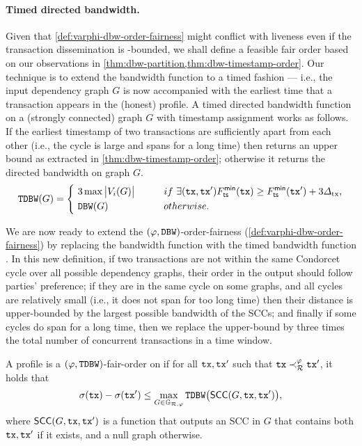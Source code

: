 \paragraph{Timed directed bandwidth.}
%
Given that \cref{def:varphi-dbw-order-fairness} might conflict with liveness even if the transaction dissemination is \txDelay-bounded, we shall define a feasible fair order based on our observations in \cref{thm:dbw-partition,thm:dbw-timestamp-order}.
%
Our technique is to extend the bandwidth function \DBW to a timed fashion --- i.e., the input dependency graph $G$ is now accompanied with the earliest time that a transaction appears in the (honest) profile.
%
A timed directed bandwidth function \TDBW on a (strongly connected) graph $G$ with timestamp assignment \mapTimestampMin works as follows.
%
If the earliest timestamp of two transactions are sufficiently apart from each other (i.e., the cycle is large and spans for a long time) then \TDBW returns an upper bound as extracted in \cref{thm:dbw-timestamp-order}; otherwise it returns the directed bandwidth on graph $G$.
%
\begin{eqnarray*}
    \mathtt{TDBW}(G) =
    \left\{~
    \begin{aligned}
         & 3 \max \big| V_i (G) \big| \hspace*{3em} if~\exists (\mathtt{tx}, \mathtt{tx}') F^{\mathsf{min}}_{\mathsf{ts}}(\mathtt{tx}) \ge F^{\mathsf{min}}_{\mathsf{ts}}(\mathtt{tx}') + 3\varDelta_{\mathrm{tx}}, \\
         & \mathtt{DBW}(G) \hspace*{5.7em} otherwise.
    \end{aligned}
    \right.
\end{eqnarray*}

We are now ready to extend the $(\varphi, \mathtt{DBW})$-order-fairness (\cref{def:varphi-dbw-order-fairness}) by replacing the bandwidth function \DBW with the timed bandwidth function \TDBW.
%
In this new definition, if two transactions are not within the same Condorcet cycle over all possible dependency graphs, their order in the output should follow parties' preference;
%
if they are in the same cycle on some graphs, and all cycles are relatively small (i.e., it does not span for too long time) then their distance is upper-bounded by the largest possible bandwidth of the SCCs;
%
and finally if some cycles do span for a long time, then we replace the upper-bound by three times the total number of concurrent transactions in a \txDelay time window.

\begin{definition}
    \label{def:varphi-tdbw-order-fairness}

    A profile \orderOutput is a $(\varphi, \mathtt{TDBW})$-fair-order on \profileSet if for all $\mathtt{tx}, \mathtt{tx}'$ such that $\mathtt{tx} \prec^\varphi_\mathcal{R} \mathtt{tx}'$, it holds that
    \[ \sigma(\mathtt{tx}) - \sigma(\mathtt{tx}') \le \max_{G \in \mathbb{G}_{\mathcal{R}, \varphi}} \mathtt{TDBW} \big( \mathsf{SCC}(G, \mathtt{tx}, \mathtt{tx}') \big), \]
    where $\mathsf{SCC}(G, \mathtt{tx}, \mathtt{tx}')$ is a function that outputs an SCC in $G$ that contains both $\mathtt{tx}, \mathtt{tx}'$ if it exists, and a null graph otherwise.
\end{definition}

